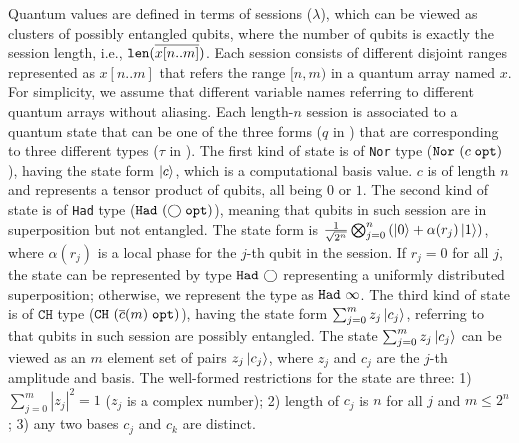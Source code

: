 Quantum values are defined in terms of sessions ($\lambda$), which can be viewed as clusters of possibly entangled qubits, where the number of qubits is exactly the session length, i.e., $\texttt{len}(\overline{x[n..m]})$.
Each session consists of different disjoint ranges represented as $x[n..m]$ that refers the range $[n,m)$ in a quantum array named $x$.
For simplicity, we assume that different variable names referring to different quantum arrays without aliasing.
Each length-$n$ session is associated to a quantum state that can be one of the three forms ($q$ in ) that are corresponding to three different types ($\tau$ in ). The first kind of state is of \texttt{Nor} type ($\texttt{Nor}~{(c\;\texttt{opt})}$), having the state form $\left\vert{c}\right\rangle$, which is a computational basis value. $c$ is of length $n$ and represents a tensor product of qubits, all being $0$ or $1$. The second kind of state is of \texttt{Had} type ($\texttt{Had}~{(\bigcirc\;\texttt{opt})}$),  meaning that qubits in such session are in superposition but not entangled.
The state form is $\frac{1}{\sqrt{2^n}}\bigotimes_{j=0}^{n}{(\left\vert{0}\right\rangle+\alpha(r_j)\left\vert{1}\right\rangle)}$, where $\alpha(r_j)$ is a local phase for the $j$-th qubit in the session. If $r_j=0$ for all $j$, the state can be represented by  type $\texttt{Had}~{\bigcirc}$ representing a uniformly distributed superposition; otherwise, we represent the type as $\texttt{Had}~{\infty}$. The third kind of state is of $\texttt{CH}$ type ($\texttt{CH}~{(\overline{c}(m)\;\texttt{opt})}$), having the state form $\sum_{j=0}^{m}{z_j\left\vert{c_j}\right\rangle}$, referring to that qubits in such session are possibly entangled. The state $\sum_{j=0}^{m}{z_j\left\vert{c_j}\right\rangle}$ can be viewed as an $m$ element set of pairs $z_j\left\vert{c_j}\right\rangle$, where $z_j$ and $c_j$ are the $j$-th amplitude and basis.
The well-formed restrictions for the state are three: 1) $\sum_{j=0}^{m}|z_j|^2=1$ ($z_j$ is a complex number); 2) length of $c_j$ is $n$ for all $j$ and $m \le 2^n$; 3) any two bases $c_j$ and $c_k$ are distinct.

